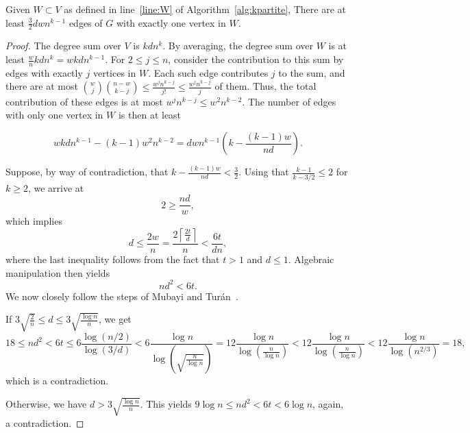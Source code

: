\begin{lemma}\label{lm:many_edges}
    Given $W  \subset V$ as defined in line~\ref{line:W} of Algorithm~\ref{alg:kpartite},
    There are at least $\frac{3}{2}dwn^{k-1}$ edges of $G$ with exactly one vertex in $W$.
    \begin{proof}
        The degree sum over $V$ is $kdn^{k}$.
        By averaging, the degree sum over $W$ is at least
        $\frac{w}{n}kdn^{k} = wkdn^{k-1}$.
        For $2 \leq j \leq n$,
        consider the contribution to this sum by edges with exactly $j$ vertices in $W$.
        Each such edge contributes $j$ to the sum, and there are at most
        $\binom{w}{j}\binom{n-w}{k-j} \leq
        \frac{w^j n^{k-j}}{j!} \leq
        \frac{w^j n^{k-j}}{j}$ of them.
        Thus, the total contribution of these edges is at most $w^j n^{k-j} \leq w^{2}n^{k-2}$.
        The number of edges with only one vertex in $W$ is then at least

        \[
            wkdn^{k-1} - (k-1)w^{2}n^{k-2} = dwn^{k-1} \left( k - \frac{(k-1)w}{nd}\right).
        \]

        Suppose, by way of contradiction,
        that $ k - \frac{(k-1)w}{nd} < \frac{3}{2}$.
        Using that $\frac{k-1}{k-3/2} \leq 2$
        for $k \geq 2$, we arrive at
        \[
             2 \geq  \frac{nd}{w},
        \]
        which implies
        \[
            d \leq \frac{2w}{n} = \frac{2 \left\lceil\frac{2t}{d} \right\rceil}{n}
            < \frac{6t}{dn},
        \]
        where the last inequality follows from the fact that $t > 1$ and $d \leq 1$.
        Algebraic manipulation then yields
        \[
            nd^2 < 6t.
        \]
        We now closely follow the steps of Mubayi and Turán~\cite{MUBAYI2010174}.

        If $3\sqrt {\frac{2}{n}} \leq d \leq 3 \sqrt{\frac{\log n}{n}}$, we get
        \[
            18 \leq nd^2
            < 6t \leq
            6 \frac{\log (n/2)}{\log(3/d) } <
            6 \frac{\log n}{\log\left(\sqrt{\frac{n}{\log n}}\right)} =
            12 \frac{\log n}{{\log \left( \frac{n}{\log n} \right)}} <
            12 \frac{\log n}{{\log \left( \frac{n}{\log n} \right)}} <
            12 \frac{\log n}{{\log \left( n^{2/3} \right)}} =
            18,
        \]
        which is a contradiction.

        Otherwise, we have $d > 3 \sqrt{\frac{\log n}{n}}$.
        This yields $9 \log n \leq nd^2 < 6t < 6 \log n$,
        again, a contradiction.
    \end{proof}
\end{lemma}

